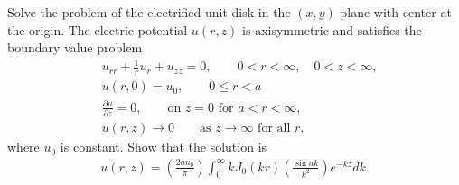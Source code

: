 \begin{problem}{7.9}
  Solve the problem of the electrified unit disk in the $(x,y)$ plane with center at the origin.
  The electric potential $u(r, z)$ is axisymmetric and satisfies the boundary value problem
  \begin{align*}
    &u_{rr} + \frac{1}{r} u_r + u_{zz} = 0, \qquad 0 < r < \infty, \quad 0 < z < \infty,\\
    &u(r, 0) = u_0, \qquad 0 \leq r < a \\
    &\frac{\partial u}{\partial z} = 0, \qquad \text{on $z=0$ for $a < r < \infty$},\\
    & u(r,z) \to 0 \qquad \text{as $z\to\infty$ for all $r$},
  \end{align*}
  where $u_0$ is constant. Show that the solution is
  \begin{align*}
    u(r,z) = \left(\frac{2au_0}{\pi}\right) \int_0^\infty k J_0(kr) \left(\frac{\sin ak}{k^2}\right)e^{-kz} dk.
  \end{align*}
\end{problem}

